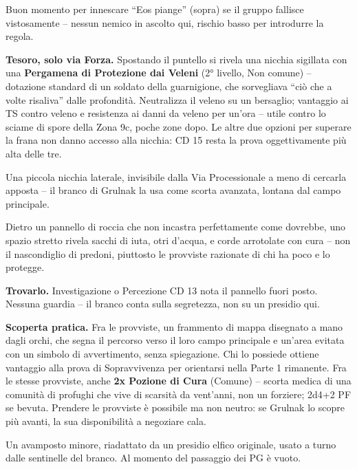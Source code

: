 Buon momento per innescare ``Eos piange'' (sopra) se il gruppo fallisce vistosamente -- nessun nemico in ascolto qui, rischio basso per introdurre la regola.

\textbf{Tesoro, solo via Forza.} Spostando il puntello si rivela una nicchia sigillata con una \textbf{Pergamena di Protezione dai Veleni} (2° livello, Non comune) -- dotazione standard di un soldato della guarnigione, che sorvegliava ``ciò che a volte risaliva'' dalle profondità. Neutralizza il veleno su un bersaglio; vantaggio ai TS contro veleno e resistenza ai danni da veleno per un'ora -- utile contro lo sciame di spore della Zona 9c, poche zone dopo. Le altre due opzioni per superare la frana non danno accesso alla nicchia: CD 15 resta la prova oggettivamente più alta delle tre.


Una piccola nicchia laterale, invisibile dalla Via Processionale a meno di cercarla apposta -- il branco di Grulnak la usa come scorta avanzata, lontana dal campo principale.

\begin{DndReadAloud}[]
  Dietro un pannello di roccia che non incastra perfettamente come dovrebbe, uno spazio stretto rivela sacchi di iuta, otri d'acqua, e corde arrotolate con cura -- non il nascondiglio di predoni, piuttosto le provviste razionate di chi ha poco e lo protegge.
\end{DndReadAloud}

\textbf{Trovarlo.} Investigazione o Percezione CD 13 nota il pannello fuori posto. Nessuna guardia -- il branco conta sulla segretezza, non su un presidio qui.

\textbf{Scoperta pratica.} Fra le provviste, un frammento di mappa disegnato a mano dagli orchi, che segna il percorso verso il loro campo principale e un'area evitata con un simbolo di avvertimento, senza spiegazione. Chi lo possiede ottiene vantaggio alla prova di Sopravvivenza per orientarsi nella Parte 1 rimanente. Fra le stesse provviste, anche \textbf{2x Pozione di Cura} (Comune) -- scorta medica di una comunità di profughi che vive di scarsità da vent'anni, non un forziere; 2d4+2 PF se bevuta. Prendere le provviste è possibile ma non neutro: se Grulnak lo scopre più avanti, la sua disponibilità a negoziare cala.


Un avamposto minore, riadattato da un presidio elfico originale, usato a turno dalle sentinelle del branco. Al momento del passaggio dei PG è vuoto.

